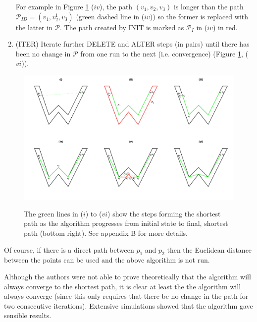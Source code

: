 \documentclass[useAMS, referee]{biom}
\begin{document}
\begin{enumerate}
For example in Figure \ref{wdia} ($iv$), the path $(v_1, v_2, v_3)$ is longer than the path $\mathcal{P}_{ID}=(v_1, v^1_2, v_3)$ (green dashed line in ($iv$)) so the former is replaced with the latter in $\mathcal{P}$. The path created by INIT is marked as $\mathcal{P}_{I}$ in  ($iv$) in red.

\item (ITER) Iterate further DELETE and ALTER steps (in pairs) until there has been no change in $\mathcal{P}$ from one run to the next (i.e. convergence) (Figure \ref{wdia}, ($vi$)).
\end{enumerate}

\begin{figure}
\includegraphics[angle=90, height=\textheight,trim=0in 0.5in 0in 0.25in]{figs/wdia.pdf} \\
\caption{The green lines in ($i$) to ($vi$) show the steps forming the shortest path as the algorithm progresses from initial state to final, shortest path (bottom right). See appendix B for more details.}
\label{wdia}
\end{figure}

Of course, if there is a direct path between $p_1$ and $p_2$ then the Euclidean distance between the points can be used and the above algorithm is not run.

Although the authors were not able to prove theoretically that the algorithm will always converge to the shortest path, it is clear at least the the algorithm will always converge (since this only requires that there be no change in the path for two consecutive iterations). Extensive simulations showed that the algorithm gave sensible results.
\end{document}
